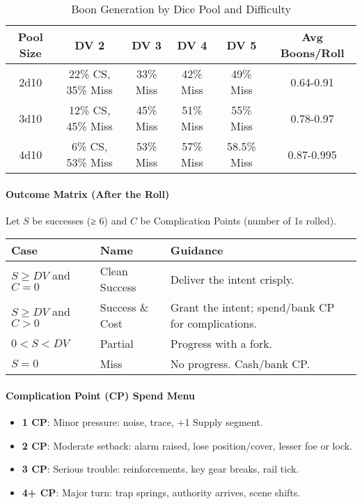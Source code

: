 \documentclass[11pt]{article}
\begin{document}
\begin{table}[htbp]
\centering
\caption{Boon Generation by Dice Pool and Difficulty}
\begin{tabular}{|c|c|c|c|c|c|}
\hline
\textbf{Pool Size} & \textbf{DV 2} & \textbf{DV 3} & \textbf{DV 4} & \textbf{DV 5} & \textbf{Avg Boons/Roll} \\
\hline
2d10 & 22\% CS, 35\% Miss & 33\% Miss & 42\% Miss & 49\% Miss & 0.64-0.91 \\
3d10 & 12\% CS, 45\% Miss & 45\% Miss & 51\% Miss & 55\% Miss & 0.78-0.97 \\
4d10 & 6\% CS, 53\% Miss & 53\% Miss & 57\% Miss & 58.5\% Miss & 0.87-0.995 \\
\hline
\end{tabular}
\end{table}

\paragraph{Outcome Matrix (After the Roll)}
Let $S$ be successes (≥ 6) and $C$ be Complication Points (number of 1s rolled).
\begin{center}
\begin{tabular}{lll}
\toprule
\textbf{Case} & \textbf{Name} & \textbf{Guidance} \\
\midrule
$S \geq DV$ and $C = 0$ & Clean Success & Deliver the intent crisply. \\
$S \geq DV$ and $C > 0$ & Success \& Cost & Grant the intent; spend/bank CP for complications. \\
$0 < S < DV$ & Partial & Progress with a fork. \\
$S = 0$ & Miss & No progress. Cash/bank CP. \\
\bottomrule
\end{tabular}
\end{center}

\paragraph{Complication Point (CP) Spend Menu}
\begin{itemize}
    \item \textbf{1 CP}: Minor pressure: noise, trace, +1 Supply segment.
    \item \textbf{2 CP}: Moderate setback: alarm raised, lose position/cover, lesser foe or lock.
    \item \textbf{3 CP}: Serious trouble: reinforcements, key gear breaks, rail tick.
    \item \textbf{4+ CP}: Major turn: trap springs, authority arrives, scene shifts.
\end{itemize}
\end{document}
